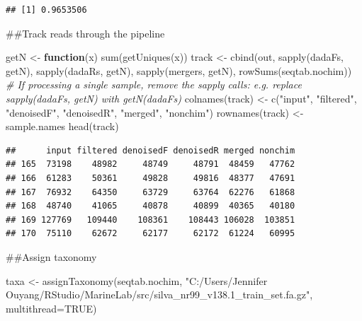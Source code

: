 \documentclass[
]{article}
\newenvironment{Shaded}{\begin{snugshade}}{\end{snugshade}}
\newcommand{\AttributeTok}[1]{\textcolor[rgb]{0.77,0.63,0.00}{#1}}
\newcommand{\CommentTok}[1]{\textcolor[rgb]{0.56,0.35,0.01}{\textit{#1}}}
\newcommand{\ConstantTok}[1]{\textcolor[rgb]{0.00,0.00,0.00}{#1}}
\newcommand{\ControlFlowTok}[1]{\textcolor[rgb]{0.13,0.29,0.53}{\textbf{#1}}}
\newcommand{\FunctionTok}[1]{\textcolor[rgb]{0.00,0.00,0.00}{#1}}
\newcommand{\NormalTok}[1]{#1}
\newcommand{\OtherTok}[1]{\textcolor[rgb]{0.56,0.35,0.01}{#1}}
\newcommand{\StringTok}[1]{\textcolor[rgb]{0.31,0.60,0.02}{#1}}
\begin{document}
\begin{verbatim}
## [1] 0.9653506
\end{verbatim}

\#\#Track reads through the pipeline

\begin{Shaded}
\begin{Highlighting}[]
\NormalTok{getN }\OtherTok{\textless{}{-}} \ControlFlowTok{function}\NormalTok{(x) }\FunctionTok{sum}\NormalTok{(}\FunctionTok{getUniques}\NormalTok{(x))}
\NormalTok{track }\OtherTok{\textless{}{-}} \FunctionTok{cbind}\NormalTok{(out, }\FunctionTok{sapply}\NormalTok{(dadaFs, getN), }\FunctionTok{sapply}\NormalTok{(dadaRs, getN), }\FunctionTok{sapply}\NormalTok{(mergers, getN), }\FunctionTok{rowSums}\NormalTok{(seqtab.nochim))}
\CommentTok{\# If processing a single sample, remove the sapply calls: e.g. replace sapply(dadaFs, getN) with getN(dadaFs)}
\FunctionTok{colnames}\NormalTok{(track) }\OtherTok{\textless{}{-}} \FunctionTok{c}\NormalTok{(}\StringTok{"input"}\NormalTok{, }\StringTok{"filtered"}\NormalTok{, }\StringTok{"denoisedF"}\NormalTok{, }\StringTok{"denoisedR"}\NormalTok{, }\StringTok{"merged"}\NormalTok{, }\StringTok{"nonchim"}\NormalTok{)}
\FunctionTok{rownames}\NormalTok{(track) }\OtherTok{\textless{}{-}}\NormalTok{ sample.names}
\FunctionTok{head}\NormalTok{(track)}
\end{Highlighting}
\end{Shaded}

\begin{verbatim}
##      input filtered denoisedF denoisedR merged nonchim
## 165  73198    48982     48749     48791  48459   47762
## 166  61283    50361     49828     49816  48377   47691
## 167  76932    64350     63729     63764  62276   61868
## 168  48740    41065     40878     40899  40365   40180
## 169 127769   109440    108361    108443 106028  103851
## 170  75110    62672     62177     62172  61224   60995
\end{verbatim}

\#\#Assign taxonomy

\begin{Shaded}
\begin{Highlighting}[]
\NormalTok{taxa }\OtherTok{\textless{}{-}} \FunctionTok{assignTaxonomy}\NormalTok{(seqtab.nochim, }\StringTok{"C:/Users/Jennifer Ouyang/RStudio/MarineLab/src/silva\_nr99\_v138.1\_train\_set.fa.gz"}\NormalTok{, }\AttributeTok{multithread=}\ConstantTok{TRUE}\NormalTok{)}
\end{Highlighting}
\end{Shaded}
\end{document}
